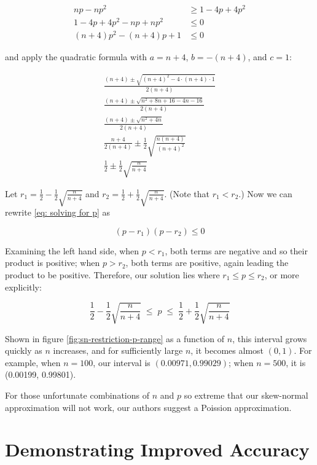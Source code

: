 \documentclass{article}
\begin{document}
\begin{align}
  np - np^2 &\geq 1 - 4p + 4p^2 \nonumber \\
  1 - 4p + 4p^2 - np + np^2 &\leq 0 \nonumber \\
  (n+4)p^2 - (n+4)p + 1 &\leq 0 \label{eq: solving for p}
\end{align}

and apply the quadratic formula with $a = n+4$, $b = -(n+4)$, and $c = 1$:

\begin{gather*}
  \frac{(n+4) \pm \sqrt{(n+4)^2 - 4 \cdot (n+4) \cdot 1}}{2(n+4)} \\
  \frac{(n+4) \pm \sqrt{n^2 + 8n + 16 - 4n - 16}}{2(n+4)} \\
  \frac{(n+4) \pm \sqrt{n^2 + 4n}}{2(n+4)} \\
  \frac{n+4}{2(n+4)} \pm \frac12 \sqrt{\frac{n(n+4)}{(n+4)^2}} \\
  \frac12 \pm \frac12 \sqrt{\frac{n}{n+4}}
\end{gather*}

Let $r_1 = \frac12 - \frac12 \sqrt{\frac{n}{n+4}}$ and $r_2 = \frac12 + \frac12
\sqrt{\frac{n}{n+4}}$. (Note that $r_1 < r_2$.) Now we can rewrite \eqref{eq:
solving for p} as

\begin{equation*}
  (p - r_1)(p - r_2) \leq 0
\end{equation*}

Examining the left hand side, when $p < r_1$, both terms are negative and so
their product is positive; when $p > r_2$, both terms are positive, again
leading the product to be positive. Therefore, our solution lies where $r_1
\leq p \leq r_2$, or more explicitly:

\begin{equation}
 \frac12 - \frac12 \sqrt{\frac{n}{n+4}} \; \leq \; p \; \leq \; \frac12 + \frac12 \sqrt{\frac{n}{n+4}}
\end{equation}

Shown in figure \ref{fig:sn-restriction-p-range} as a function of $n$, this
interval grows quickly as $n$ increases, and for sufficiently large $n$, it
becomes almost $(0, 1)$. For example, when $n=100$, our interval is $(0.00971,
0.99029)$; when $n=500$, it is (0.00199, 0.99801).

For those unfortunate combinations of $n$ and $p$ so extreme that our
skew-normal approximation will not work, our authors suggest a Poission
approximation.

\section{Demonstrating Improved Accuracy}
\end{document}
